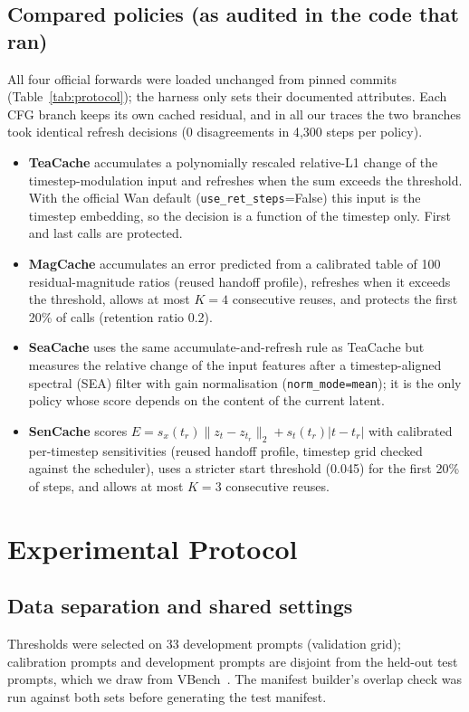 \documentclass[11pt,a4paper]{article}
\begin{document}
\subsection{Compared policies (as audited in the code that ran)}
All four official forwards were loaded unchanged from pinned commits (Table~\ref{tab:protocol}); the harness only sets
their documented attributes. Each CFG branch keeps its own cached residual, and in all our traces the two branches took
identical refresh decisions (0 disagreements in 4{,}300 steps per policy).
\begin{itemize}
\item \textbf{TeaCache} accumulates a polynomially rescaled relative-L1 change of the timestep-modulation input and refreshes
when the sum exceeds the threshold. With the official Wan default (\texttt{use\_ret\_steps}=False) this input is the
timestep embedding, so the decision is a function of the timestep only. First and last calls are protected.
\item \textbf{MagCache} accumulates an error predicted from a calibrated table of 100 residual-magnitude ratios (reused
handoff profile), refreshes when it exceeds the threshold, allows at most $K=4$ consecutive reuses, and protects the first
20\% of calls (retention ratio 0.2).
\item \textbf{SeaCache} uses the same accumulate-and-refresh rule as TeaCache but measures the relative change of the
input features after a timestep-aligned spectral (SEA) filter with gain normalisation (\texttt{norm\_mode=mean}); it is the
only policy whose score depends on the content of the current latent.
\item \textbf{SenCache} scores $E=s_x(t_r)\lVert z_t-z_{t_r}\rVert_2+s_t(t_r)|t-t_r|$ with calibrated per-timestep
sensitivities (reused handoff profile, timestep grid checked against the scheduler), uses a stricter start threshold
(0.045) for the first 20\% of steps, and allows at most $K=3$ consecutive reuses.
\end{itemize}

\section{Experimental Protocol}
\subsection{Data separation and shared settings}
Thresholds were selected on 33 development prompts (validation grid); calibration prompts and development prompts are
disjoint from the held-out test prompts, which we draw from VBench~\citep{huang2024vbench}. The manifest builder's
overlap check was run against both sets before generating the test manifest.
\end{document}
